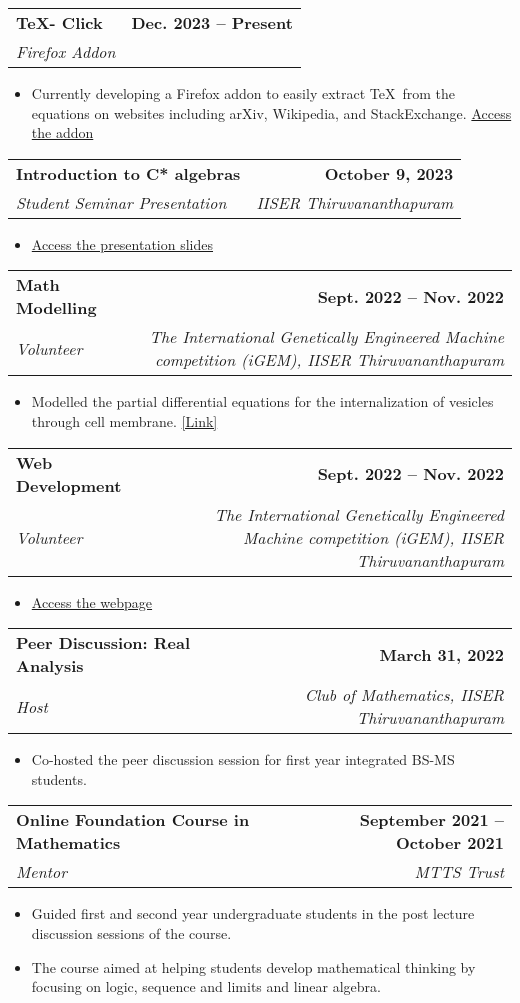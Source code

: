 \documentclass[letterpaper,11pt]{article}
\makeatletter
\newcommand{\resumeItem}[1]{
  \item\small{
    {#1 \vspace{-2pt}}
  }
}
\newcommand{\resumeSubheading}[4]{
  \vspace{-2pt}\item
    \begin{tabular*}{1.0\textwidth}[t]{l@{\extracolsep{\fill}}r}
      \textbf{#1} & \textbf{\small #2} \\
      \textit{\small#3} & \textit{\small #4} \\
    \end{tabular*}\vspace{-7pt}
}
\newcommand{\resumeItemListStart}{\begin{itemize}}
\newcommand{\resumeItemListEnd}{\end{itemize}\vspace{-4pt}}
\makeatother
\begin{document}
        \resumeSubheading{\TeX - Click}{Dec. 2023 -- Present}{Firefox Addon}{}
            \resumeItemListStart
                \resumeItem{Currently developing a Firefox addon to easily extract \TeX \ from the equations on websites including arXiv, Wikipedia, and StackExchange. \href{https://addons.mozilla.org/en-US/firefox/addon/tex-click/}{Access the addon}}
            \resumeItemListEnd

        \resumeSubheading{Introduction to C* algebras}{October 9, 2023}{Student Seminar Presentation}{IISER Thiruvananthapuram}
            \resumeItemListStart
                \resumeItem{\href{https://github.com/joelsleeba/presentations/blob/master/IISERTVM-C-Algebra/pres.pdf}{Access the presentation slides}}
            \resumeItemListEnd

        \resumeSubheading{Math Modelling}{Sept. 2022 -- Nov. 2022}{Volunteer}{The International Genetically Engineered Machine competition (iGEM), IISER Thiruvananthapuram}
            \resumeItemListStart
                \resumeItem{Modelled the partial differential equations for the internalization of vesicles through cell membrane. \href{https://2022.igem.wiki/iiser-tvm/model}{[Link]}}
            \resumeItemListEnd

        \resumeSubheading{Web Development}{Sept. 2022 -- Nov. 2022}{Volunteer}{The International Genetically Engineered Machine competition (iGEM), IISER Thiruvananthapuram}
            \resumeItemListStart
                \resumeItem{\href{https://2022.igem.wiki/iiser-tvm}{Access the webpage}}
            \resumeItemListEnd

        \resumeSubheading{Peer Discussion: Real Analysis}{March 31, 2022}{Host}{Club of Mathematics, IISER Thiruvananthapuram}
            \resumeItemListStart
                \resumeItem{Co-hosted the peer discussion session for first year integrated BS-MS students.}
            \resumeItemListEnd



        \resumeSubheading{Online Foundation Course in Mathematics}{September 2021 -- October 2021}{Mentor}{MTTS Trust}
            \resumeItemListStart
                \resumeItem{Guided first and second year undergraduate students in the post lecture discussion sessions of the course.}
                \resumeItem{The course aimed at helping students develop mathematical thinking by focusing on logic, sequence and limits and linear algebra.}
            \resumeItemListEnd
\end{document}
